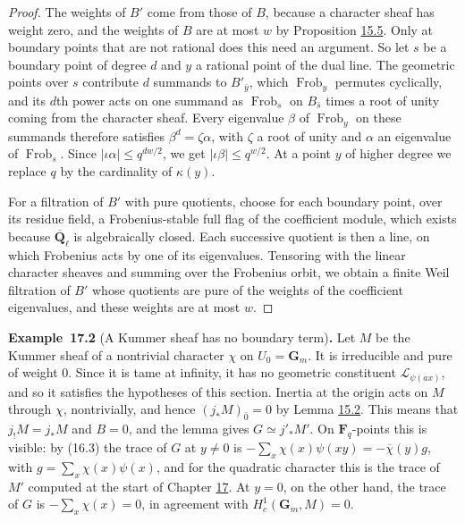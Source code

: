 \documentclass[11pt]{article}
\newenvironment{bpstatement}[2]{\par\addvspace{0.6\baselineskip}\noindent\textbf{#1}#2\textbf{.}\enspace\ignorespaces}
  {\par\addvspace{0.4\baselineskip}}
\begin{document}
\begin{proof}[{Proof}]
The weights of \(B'\) come from those of \(B\), because a character sheaf has weight zero, and the weights of \(B\) are at most \(w\) by Proposition \hyperref[bp134]{15.5}. Only at boundary points that are not rational does this need an argument. So let \(s\) be a boundary point of degree \(d\) and \(y\) a rational point of the dual line. The geometric points over \(s\) contribute \(d\) summands to \(B'_{\bar y}\), which \(\operatorname{Frob}_y\) permutes cyclically, and its \(d\)th power acts on one summand as \(\operatorname{Frob}_s\) on \(B_{\bar s}\) times a root of unity coming from the character sheaf. Every eigenvalue \(\beta\) of \(\operatorname{Frob}_y\) on these summands therefore satisfies \(\beta^d=\zeta\alpha\), with \(\zeta\) a root of unity and \(\alpha\) an eigenvalue of \(\operatorname{Frob}_s\). Since \(|\iota\alpha|\le q^{dw/2}\), we get \(|\iota\beta|\le q^{w/2}\). At a point \(y\) of higher degree we replace \(q\) by the cardinality of \(\kappa(y)\).

For a filtration of \(B'\) with pure quotients, choose for each boundary point, over its residue field, a Frobenius-stable full flag of the coefficient module, which exists because \(\overline{\mathbf Q}_\ell\) is algebraically closed. Each successive quotient is then a line, on which Frobenius acts by one of its eigenvalues. Tensoring with the linear character sheaves and summing over the Frobenius orbit, we obtain a finite Weil filtration of \(B'\) whose quotients are pure of the weights of the coefficient eigenvalues, and these weights are at most \(w\).
\end{proof}

\label{bp229}%
\begin{bpstatement}{Example~17.2}{ (A Kummer sheaf has no boundary term)}
Let \(M\) be the Kummer sheaf of a nontrivial character \(\chi\) on \(U_0=\mathbf G_m\). It is irreducible and pure of weight \(0\). Since it is tame at infinity, it has no geometric constituent \(\mathcal L_{\psi(ax)}\), and so it satisfies the hypotheses of this section. Inertia at the origin acts on \(M\) through \(\chi\), nontrivially, and hence \((j_*M)_{\bar0}=0\) by Lemma \hyperref[bp127]{15.2}. This means that \(j_!M=j_*M\) and \(B=0\), and the lemma gives \(G\simeq j'_*M'\). On \(\mathbf F_q\)-points this is visible: by (16.3) the trace of \(G\) at \(y\ne0\) is \(-\sum_x\chi(x)\psi(xy)=-\overline\chi(y)g\), with \(g=\sum_x\chi(x)\psi(x)\), and for the quadratic character this is the trace of \(M'\) computed at the start of Chapter \hyperref[bp223]{17}. At \(y=0\), on the other hand, the trace of \(G\) is \(-\sum_x\chi(x)=0\), in agreement with \(H^1_c(\mathbf G_m,M)=0\).
\end{bpstatement}
\end{document}
